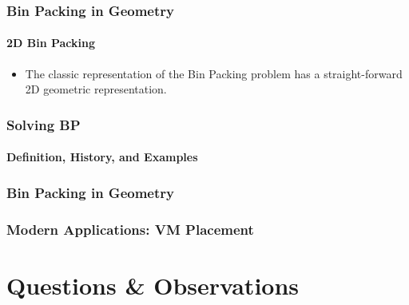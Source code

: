 \documentclass[10pt,    %
    english,            %
    xcolor=table,       %
    envcountsect,        %
    aspectratio=169     %
]{beamer}
\begin{document}
\begin{frame}
    \frametitle{Bin Packing in Geometry}
    \framesubtitle{2D Bin Packing}
    
    \begin{itemize}
        \item The classic representation of the Bin Packing problem has a straight-forward 2D geometric representation.
    \end{itemize}

    \vspace{-10pt}

    \begin{figure}
        \centering
    \end{figure}
\end{frame}


\begin{frame}
    \frametitle{Solving BP}
    \framesubtitle{Definition, History, and Examples}

\end{frame}

\begin{frame}
    \frametitle{Bin Packing in Geometry}

\end{frame}

\begin{frame}
    \frametitle{Modern Applications: VM Placement}

\end{frame}


\section{Questions \& Observations}
\sectionframe
\end{document}
